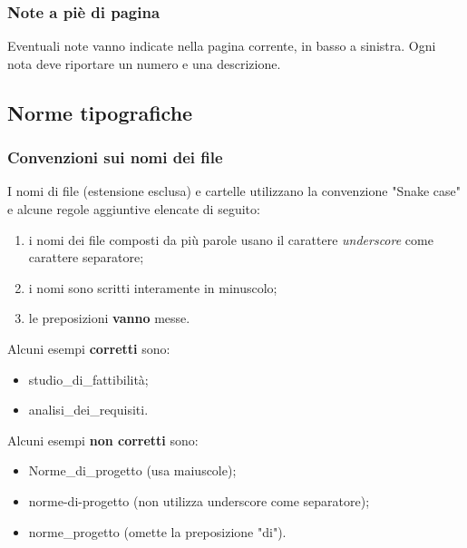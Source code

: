\subsubsection{Note a piè di pagina}
Eventuali note vanno indicate nella pagina corrente, in basso a sinistra. Ogni nota deve riportare un numero e una descrizione.

\subsection{Norme tipografiche}
\subsubsection{Convenzioni sui nomi dei file}
I nomi di file (estensione esclusa) e cartelle utilizzano la convenzione "Snake case\glo" e alcune regole aggiuntive elencate di seguito: \begin{enumerate}
\item i nomi dei file composti da più parole usano il carattere \textit{underscore} come carattere separatore;
\item i nomi sono scritti interamente in minuscolo;
\item le preposizioni \textbf{vanno} messe.
\end{enumerate}
Alcuni esempi \textbf{corretti} sono: \begin{itemize}
\item studio\_di\_fattibilità;
\item analisi\_dei\_requisiti.
\end{itemize}
Alcuni esempi \textbf{non corretti} sono: \begin{itemize}
\item Norme\_di\_progetto (usa maiuscole);
\item norme-di-progetto (non utilizza underscore come separatore);
\item norme\_progetto (omette la preposizione "di").
\end{itemize}


